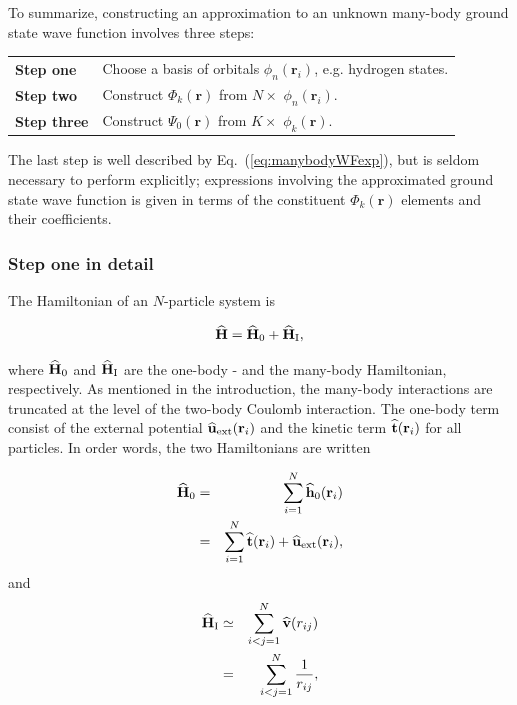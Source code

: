 To summarize, constructing an approximation to an unknown many-body ground state wave function involves three steps:

\begin{center}
\begin{tabular}{l|l}
 \textbf{Step one}   &  Choose a basis of orbitals $\phi_n(\mathbf{r}_i)$, e.g. hydrogen states. \\
 \textbf{Step two}   &  Construct $\Phi_k(\mathbf{r})$ from $N\times$ $\phi_n(\mathbf{r}_i)$.   \\
 \textbf{Step three} &  Construct $\Psi_0(\mathbf{r})$ from $K\times$ $\phi_k(\mathbf{r})$.     \\
\end{tabular}
\end{center}

The last step is well described by Eq.~(\ref{eq:manybodyWFexp}), but is seldom necessary to perform explicitly; expressions involving the approximated ground state wave function is given in terms of the constituent $\Phi_k(\mathbf{r})$ elements and their coefficients.

\subsubsection{Step one in detail}

The Hamiltonian of an $N$-particle system is 

\begin{equation}
 {\bf\widehat{H}} = {\bf\widehat{H}}_0 + {\bf\widehat{H}}_\mathrm{I},
\end{equation}

where ${\bf\widehat{H}}_0$ and ${\bf\widehat{H}}_\mathrm{I}$ are the one-body - and the many-body Hamiltonian, respectively. As mentioned in the introduction, the many-body interactions are truncated at the level of the two-body Coulomb interaction. The one-body term consist of the external potential ${\bf\widehat{u}}_\mathrm{ext}(\mathbf{r}_i)$ and the kinetic term ${\bf\widehat{t}}(\mathbf{r}_i)$ for all particles. In order words, the two Hamiltonians are written

\begin{eqnarray}
 {\bf\widehat{H}}_0 &=& \sum_{i=1}^N {\bf\widehat{h}}_0(\mathbf{r}_i) \\
          &=& \sum_{i=1}^N {\bf\widehat{t}}(\mathbf{r}_i) + {\bf\widehat{u}}_\mathrm{ext}(\mathbf{r}_i), \nonumber
  \end{eqnarray}
  and
\begin{eqnarray}
 {\bf\widehat{H}}_\mathrm{I} &\simeq& \sum_{i<j=1}^N {\bf\widehat{v}}(r_{ij}) \\
          &=& \sum_{i<j=1}^N \frac{1}{r_{ij}},  \nonumber
\end{eqnarray}

